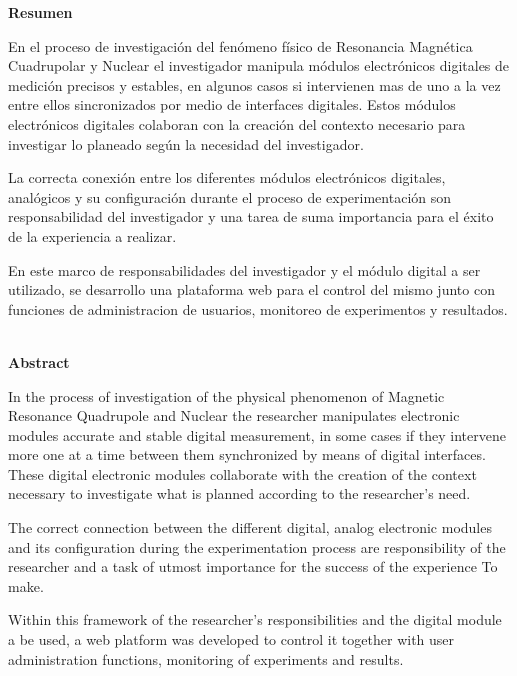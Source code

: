 \begin{center}
    \textbf{Resumen}
\end{center}

En el proceso de investigación del fenómeno físico de Resonancia Magnética 
Cuadrupolar y Nuclear el investigador manipula módulos electrónicos 
digitales de medición precisos y estables, en algunos casos si intervienen mas 
de uno a la vez entre ellos sincronizados por medio de interfaces digitales. 
Estos módulos electrónicos digitales colaboran con la creación del contexto
necesario para investigar lo planeado según la necesidad del investigador.

La correcta conexión entre los diferentes módulos electrónicos digitales, analógicos
y su configuración durante el proceso de experimentación son responsabilidad
del investigador y una tarea de suma importancia para el éxito de la experiencia
a realizar.

En este marco de responsabilidades del investigador y el módulo digital a
ser utilizado, se desarrollo una plataforma web para el control del mismo junto con
funciones de administracion de usuarios, monitoreo de experimentos y resultados.
\\\\

\begin{center}
    \textbf{Abstract}
\end{center}

In the process of investigation of the physical phenomenon of Magnetic Resonance
Quadrupole and Nuclear the researcher manipulates electronic modules
accurate and stable digital measurement, in some cases if they intervene more
one at a time between them synchronized by means of digital interfaces.
These digital electronic modules collaborate with the creation of the context
necessary to investigate what is planned according to the researcher's need.

The correct connection between the different digital, analog electronic modules
and its configuration during the experimentation process are responsibility
of the researcher and a task of utmost importance for the success of the experience
To make.

Within this framework of the researcher's responsibilities and the digital module a
be used, a web platform was developed to control it together with
user administration functions, monitoring of experiments and results.

\newpage
